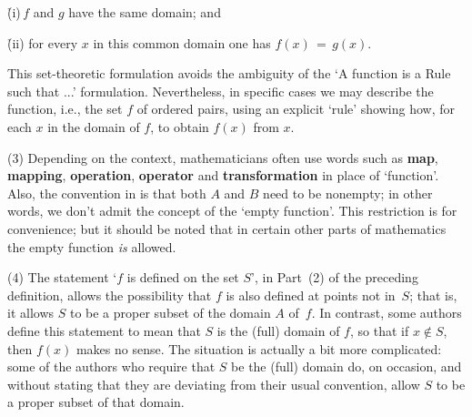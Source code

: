         \h (i)\,$f$ and $g$ have the same domain; and

        \h (ii) for every $x$ in this common domain one has $f(x) \,=\, g(x)$.

\VA

\noindent This set-theoretic formulation avoids the ambiguity of the `A function is a Rule such that ...' formulation.
    Nevertheless, in specific cases we may describe the function, i.e., the set $f$ of ordered pairs,
    using an explicit `rule' showing how, for each $x$ in the domain of $f$, to obtain $f(x)$ from $x$.

\V

        (3) Depending on the context, mathematicians often use words such as {\bf map}, {\bf mapping}, {\bf operation},
    {\bf operator} and {\bf transformation} in place of `function'.
    Also, the convention in {\TheseNotes} is that both $A$ and $B$ need to be nonempty; in other words, we don't admit the concept of the `empty function'.
    This restriction is for convenience; but it should be noted that in certain other parts of mathematics the empty function {\em is} allowed.

\V

        (4) The statement `$f$ is defined on the set $S$', in Part~(2) of the preceding definition,
    allows the possibility that $f$ is also defined at points not in~$S$; that is, it allows $S$ to be a proper subset of the domain $A$ of~$f$.
    In contrast, some authors define this statement to mean that $S$ is the (full) domain of $f$, so that if $x\not \in S$, then $f(x)$ makes no sense.
    The situation is actually a bit more complicated: some of the authors who require that $S$ be the (full) domain do, on occasion,
    and without stating that they are deviating from their usual convention, allow $S$ to be a proper subset of that domain.



